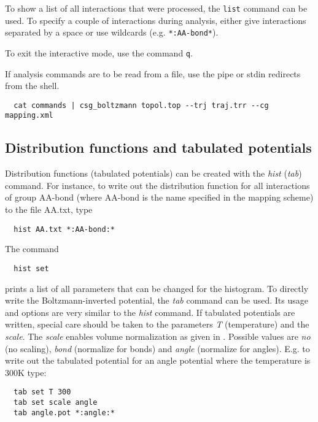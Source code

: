 To show a list of all interactions that were processed, the \texttt{list} command can be used. To specify a couple of interactions during analysis, either give interactions separated by a space or use wildcards (e.g. \texttt{*:AA-bond*}).

To exit the interactive mode, use the command \texttt{q}. 

If analysis commands are to be read from a file, use the pipe or stdin redirects from the shell.
\begin{verbatim}
  cat commands | csg_boltzmann topol.top --trj traj.trr --cg mapping.xml
\end{verbatim}

\subsection{Distribution functions and tabulated potentials}
Distribution functions (tabulated potentials) can be created with the \textit{hist} (\textit{tab}) command.
For instance, to write out the distribution function for all interactions of group AA-bond (where AA-bond is the name specified in the mapping scheme) to the file AA.txt, type
\begin{verbatim}
  hist AA.txt *:AA-bond:*
\end{verbatim}
The command
\begin{verbatim}
  hist set
\end{verbatim}
prints a list of all parameters that can be changed for the histogram. To directly write the Boltzmann-inverted potential, the \textit{tab} command can be used. Its usage and options are very similar to the \textit{hist} command. If tabulated potentials are written, special care should be taken to the parameters \textit{T} (temperature) and the \textit{scale}. The \textit{scale} enables volume normalization as given in . Possible values are \textit{no} (no scaling), \textit{bond} (normalize for bonds) and \textit{angle} (normalize for angles). E.g. to write out the tabulated potential for an angle potential where the temperature is 300K type:
\begin{verbatim}
  tab set T 300
  tab set scale angle
  tab angle.pot *:angle:*
\end{verbatim}

